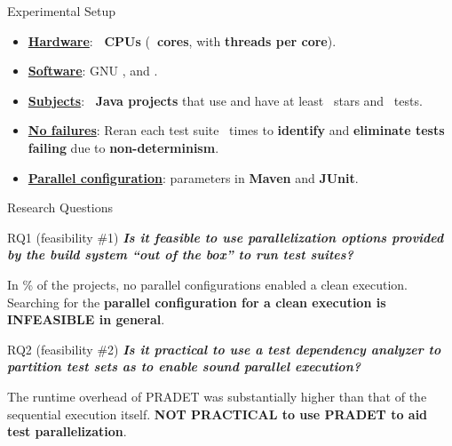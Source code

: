 \documentclass{beamer}
\begin{document}
\begin{frame}{Experimental Setup}
	\begin{itemize}
		\item{\textbf{\underline{Hardware}}: \textbf{\rsm \NumCPUs\ CPUs} (\textbf{\rsm \NumCores\ cores}, with \textbf{ threads per core}).}\pause
		\item{\textbf{\underline{Software}}: GNU \textbf{} \BashVersion, and \textbf{} \MavenVersion.}\pause
		\item{\textbf{\underline{Subjects}}: \textbf{\rsm \NumProjects\ Java projects} that use \textbf{} and have at least \NumStars\ stars and \NumTests\ tests.}\pause
		\item{\textbf{\underline{No failures}}: Reran each test suite \NumRepeatsManifest\ times to \textbf{\rsm identify} and \textbf{\rsm eliminate tests failing} due to \textbf{\rsm non-determinism}.}\pause
		\item{\textbf{\underline{Parallel configuration}}: parameters in \textbf{\rsm Maven} and \textbf{\rsm JUnit}.}
	\end{itemize}
\end{frame}

\begingroup
\renewcommand{\disp}{}
\begin{frame}
	\begin{center}
		Research Questions
	\end{center}
\end{frame}
\endgroup
\addtocounter{framenumber}{-1}

\begin{frame}{RQ1 (feasibility \#1)}
	\textbf{\textit{Is it {\rsm feasible to use parallelization} options provided by the build system ``{\rsm out of the box}'' to run test suites?}}\pause
	\begin{center}
		\begin{tcolorbox}
			In \NumProjectsParExecFailsPercentage\% of the projects, no parallel configurations enabled a clean execution. Searching for the {\color{red}\textbf{parallel configuration for a clean execution is INFEASIBLE in general}}.
		\end{tcolorbox}
	\end{center}
\end{frame}

\begin{frame}{RQ2 (feasibility \#2)}
	\textbf{\textit{Is it {\rsm practical to use a test dependency analyzer} to partition test sets as to enable {\rsm sound} parallel execution?}}\pause
	\begin{center}
		\begin{tcolorbox}
			The runtime overhead of PRADET was substantially higher than that of the sequential execution itself. \textbf{\color{red} NOT PRACTICAL to use PRADET to aid test parallelization}.
		\end{tcolorbox}
	\end{center}
\end{frame}
\end{document}
